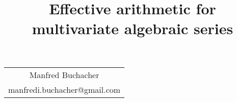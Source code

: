 \documentclass[a4paper,draft]{amsart}
\title[Effective arithmetic for multivariate algebraic series]{Effective arithmetic for multivariate algebraic series}
\theoremstyle{definition}
\begin{document}
\maketitle

\begin{center}
\begin{tabular}{@{}c@{}}
    Manfred Buchacher \\
    \normalsize manfredi.buchacher@gmail.com
  \end{tabular}%
  \end{center}

%
%
%
%
%
%
%
%
%
%
%
%
%
\end{document}
